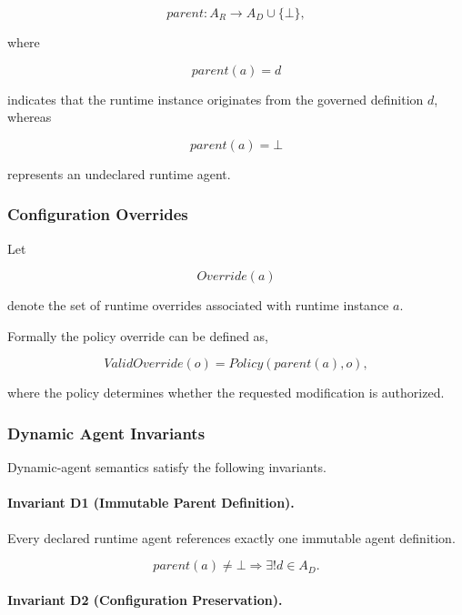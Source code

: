 \documentclass[10pt]{article}
\begin{document}
\begin{equation}
parent :
A_R
\rightarrow
A_D
\cup
\{\bot\},
\label{eq:dynamic_agent2}
\end{equation}

where

\[
parent(a)=d
\]

indicates that the runtime instance originates from the governed definition
$d$, whereas

\[
parent(a)=\bot
\]

represents an undeclared runtime agent.

\subsubsection{Configuration Overrides}

Let

\[
Override(a)
\]

denote the set of runtime overrides associated with runtime instance
$a$.

Formally the policy override can be defined as,

\begin{equation}
ValidOverride(o)
=
Policy(parent(a),o),
\label{eq:dynamic_agent3}
\end{equation}

where the policy determines whether the requested modification is authorized.

\subsubsection{Dynamic Agent Invariants}

Dynamic-agent semantics satisfy the following invariants.

\paragraph{Invariant D1 (Immutable Parent Definition).}

Every declared runtime agent references exactly one immutable agent definition.

\begin{equation}
parent(a)\neq\bot
\Longrightarrow
\exists ! d\in A_D.
\label{eq:dynamic_agent4}
\end{equation}

\paragraph{Invariant D2 (Configuration Preservation).}
\end{document}
